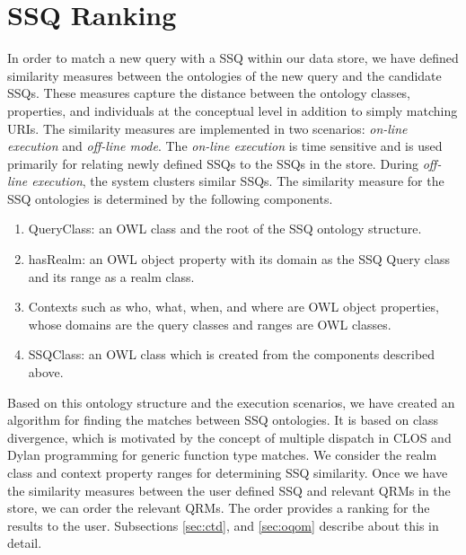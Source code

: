 \section{SSQ Ranking}
\label{sec:ssq}
In order to match a new query with a SSQ within our data store, we
have defined similarity measures between the ontologies of the new
query and the candidate SSQs. These measures capture the distance
between the ontology classes, properties, and individuals at the
conceptual level in addition to simply matching URIs. The similarity
measures are implemented in two scenarios: \textit{on-line execution}
and \textit{off-line mode}. The \textit{on-line execution} is time
sensitive and is used primarily for relating newly defined SSQs to the
SSQs in the store. During \textit{off-line execution}, the system
clusters similar SSQs.
The similarity measure for the SSQ ontologies is determined by the
following components.
\begin{enumerate}
    \item QueryClass: an OWL class and the root of the SSQ ontology
      structure.
    \item hasRealm: an OWL object property with its domain as the SSQ
      Query class and its range as a realm class.
    \item Contexts such as who, what, when, and where are OWL object
      properties, whose domains are the query classes and ranges are
      OWL classes.
    \item SSQClass: an OWL class which is created from the components
      described above.
\end{enumerate}
Based on this ontology structure and the execution scenarios, we have
created an algorithm for finding the matches between SSQ
ontologies. It is based on class divergence, which is motivated by the
concept of multiple dispatch in CLOS \cite{95411} and Dylan
programming \cite{DBLP:conf/oopsla/BarrettCHMPW96} for generic
function type matches. We consider the realm class and context
property ranges for determining SSQ similarity. Once we have the similarity measures between the user defined SSQ and relevant QRMs in the store, we can order the relevant QRMs. The order provides a ranking for the results to the user. Subsections \ref{sec:ctd}, and \ref{sec:oqom} describe about this in detail.



